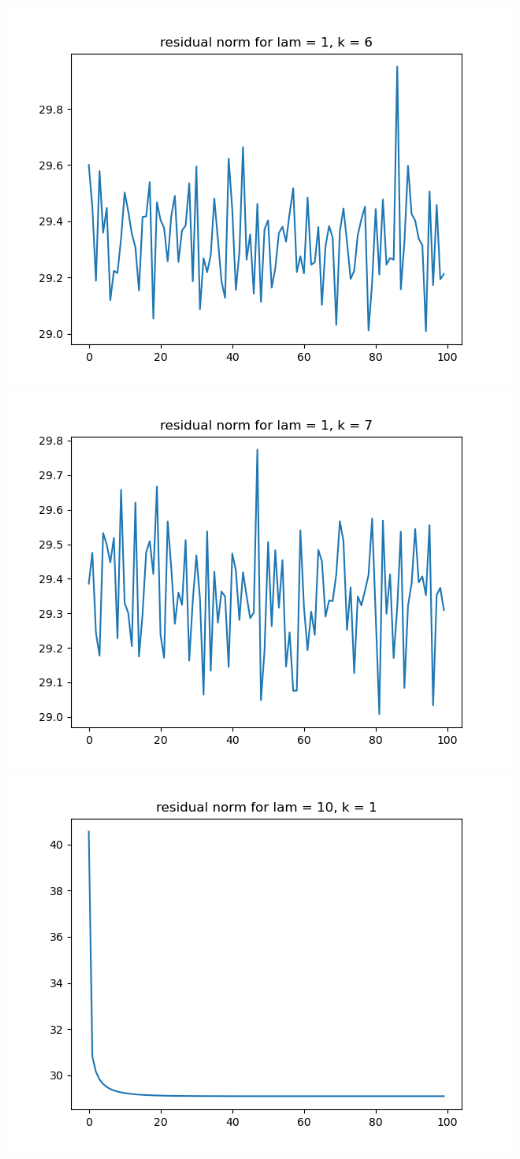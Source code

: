 \documentclass{article}
\begin{document}
\begin{enumerate}
\begin{enumerate}
\begin{center}
			\includegraphics[scale=.3]{hw7p1 residual norm for lamcount = 2, k = 6}
			\includegraphics[scale=.3]{hw7p1 residual norm for lamcount = 2, k = 7}
			\includegraphics[scale=.3]{hw7p1 residual norm for lamcount = 3, k = 1}

\end{center}
\end{enumerate}
\end{enumerate}
\end{document}
